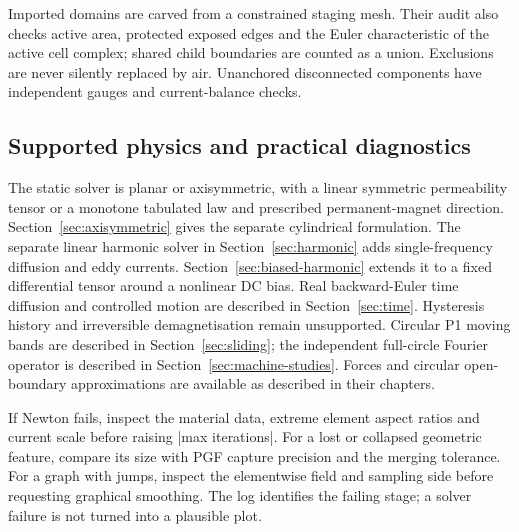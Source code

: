 Imported domains are carved from a constrained staging mesh. Their audit also
checks active area, protected exposed edges and the Euler characteristic of the
active cell complex; shared child boundaries are counted as a union. Exclusions
are never silently replaced by air. Unanchored disconnected components have
independent gauges and current-balance checks.

\subsection{Supported physics and practical diagnostics}
The static solver is planar or axisymmetric, with a linear symmetric permeability
tensor or a monotone tabulated law and prescribed permanent-magnet direction.
Section~\ref{sec:axisymmetric} gives the separate cylindrical formulation.
The separate linear harmonic solver in Section~\ref{sec:harmonic} adds
single-frequency diffusion and eddy currents. Section~\ref{sec:biased-harmonic}
extends it to a fixed differential tensor around a nonlinear DC bias.
Real backward-Euler time diffusion and controlled motion are described in
Section~\ref{sec:time}. Hysteresis history and irreversible demagnetisation
remain unsupported. Circular P1 moving bands
are described in Section~\ref{sec:sliding}; the independent full-circle Fourier
operator is described in Section~\ref{sec:machine-studies}. Forces and circular
open-boundary approximations are available as described in their chapters.

If Newton fails, inspect the material data, extreme element aspect ratios
and current scale before raising |max iterations|. For a lost or collapsed
geometric feature, compare its size with PGF capture precision and the
merging tolerance. For a graph with jumps, inspect the elementwise field
and sampling side before requesting graphical smoothing. The log identifies
the failing stage; a solver failure is not turned into a plausible plot.

